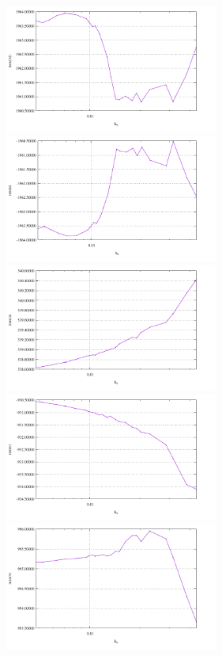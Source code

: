 \begin{center}
\includegraphics[width=7cm]{python_codes/fieldstone_25/results/max_vel_010.pdf}\\
\includegraphics[width=7cm]{python_codes/fieldstone_25/results/min_u_010.pdf}
\includegraphics[width=7cm]{python_codes/fieldstone_25/results/max_u_010.pdf}\\
\includegraphics[width=7cm]{python_codes/fieldstone_25/results/min_v_010.pdf}
\includegraphics[width=7cm]{python_codes/fieldstone_25/results/max_v_010.pdf}\\

\end{center}
